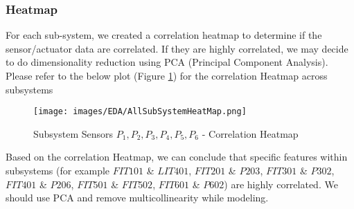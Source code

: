 \documentclass{article}
\begin{document}
\subsubsection{Heatmap}
    For each sub-system, we  created a correlation heatmap to determine if the sensor/actuator data are correlated. If they are highly correlated, we may decide to do dimensionality reduction using PCA (Principal Component Analysis). Please refer to the below plot (Figure \ref{fig:heatmap}) for the correlation Heatmap across subsystems 
    \begin{figure}[!ht]
        \caption{Subsystem Sensors ${P_1, P_2, P_3, P_4, P_5, P_6}$ - Correlation Heatmap}
        \label{fig:heatmap}
            \texttt{[image: images/EDA/AllSubSystemHeatMap.png]}
    \end{figure}
    Based on the correlation Heatmap, we can conclude  that specific features within subsystems (for example $FIT101$ \& $LIT401$, $FIT201$ \& $P203$, $FIT301$ \& $P302$, $FIT401$ \& $P206$, $FIT501$ \& $FIT502$, $FIT601$ \& $P602$) are highly correlated. We should use PCA and remove multicollinearity while modeling. \cite{infraLimit}   
\clearpage
\end{document}
